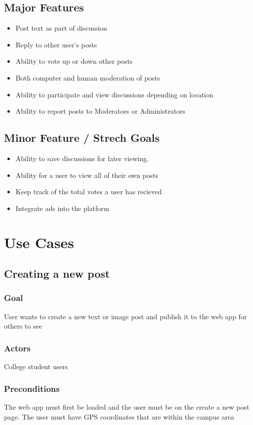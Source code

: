 \documentclass[12pt]{article}
\begin{document}
\subsection{Major Features}
\begin{itemize}
      \item Post text as part of discussion
      \item Reply to other user's posts
      \item Ability to vote up or down other posts
      \item Both computer and human moderation of posts
      \item Ability to participate and view discussions depending on location
      \item Ability to report posts to Moderators or Administrators
\end{itemize}
\subsection{Minor Feature / Strech Goals}
\begin{itemize}
      \item Ability to save discussions for later viewing.
      \item Ability for a user to view all of their own posts
      \item Keep track of the total votes a user has recieved
      \item Integrate ads into the platform
\end{itemize}
\section{Use Cases}

\subsection{Creating a new post}

\subsubsection{Goal}
User wants to create a new text or image post and publish it to the web app for others to see

\subsubsection{Actors}
College student users

\subsubsection{Preconditions}
The web app must first be loaded and the user must be on the create a new post page. The user must have GPS coordinates that are within the campus area
\end{document}
